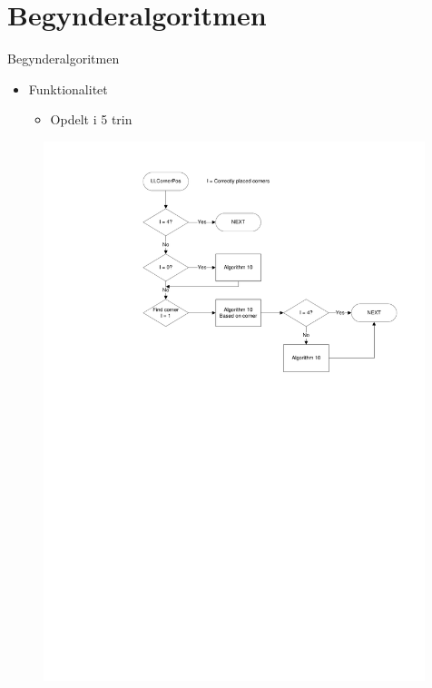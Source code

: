 \section{Begynderalgoritmen}
\begin{frame}{Begynderalgoritmen}
\begin{itemize}
	\item Funktionalitet
	\begin{itemize}
		\item Opdelt i 5 trin
	\end{itemize}
\end{itemize}
\begin{figure}
	\centering
		\includegraphics[width=0.99\textwidth, trim = 20mm 100mm 10mm 7mm, clip]{input/pics/LLCornerPos.pdf}
	\label{fig:LLCornerPos}
\end{figure}

\end{frame}

